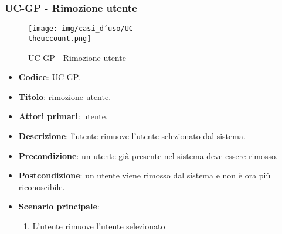 \subsubsection{UC\theuccount-GP - Rimozione utente}
		\begin{figure}[H]
			\centering
				\texttt{[image: img/casi\_d'uso/UC\\theuccount.png]}\\
			\caption{UC\theuccount-GP - Rimozione utente}
		\end{figure}
	\begin{itemize}
		\item \textbf{Codice}: UC\theuccount-GP.
		\item \textbf{Titolo}: rimozione utente.
		\item \textbf{Attori primari}: utente.
		\item \textbf{Descrizione}: l'utente rimuove l'utente selezionato dal sistema.
		\item \textbf{Precondizione}: un utente già presente nel sistema deve essere rimosso.
		\item \textbf{Postcondizione}: un utente viene rimosso dal sistema e non è ora più riconoscibile.
		\item \textbf{Scenario principale}:
		\begin{enumerate}
			\item L'utente rimuove l'utente selezionato
		\end{enumerate}
\end{itemize}

